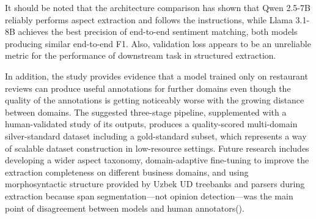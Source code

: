 \documentclass[bdcc,article,submit,moreauthors]{Definitions/mdpi}
\begin{document}
It should be noted that the architecture comparison has shown that Qwen 2.5-7B reliably performs aspect extraction and follows the instructions, while Llama 3.1-8B achieves the best precision of end-to-end sentiment matching, both models producing similar end-to-end F1. Also, validation loss appears to be an unreliable metric for the performance of downstream task in structured extraction. 

In addition, the study provides evidence that a model trained only on restaurant reviews can produce useful annotations for further domains even though the quality of the annotations is getting noticeably worse with the growing distance between domains. The suggested three-stage pipeline, supplemented with a human-validated study of its outputs, produces a quality-scored multi-domain silver-standard dataset including a gold-standard subset, which represents a way of scalable dataset construction in low-resource settings. Future research includes developing a wider aspect taxonomy, domain-adaptive fine-tuning to improve the extraction completeness on different business domains, and using morphosyntactic structure provided by Uzbek UD treebanks and parsers\cite{MATLATIPOV2026112857,11632281,10.1007/978-3-032-29532-3_15} during extraction because span segmentation—not opinion detection—was the main point of disagreement between models and human annotators().

\vspace{6pt} 



\end{document}
